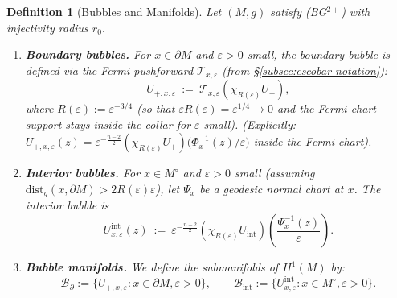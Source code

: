 \documentclass[11pt,reqno,a4paper]{amsart}
\numberwithin{equation}{section}
\newcommand{\dist}{\mathrm{dist}}
\theoremstyle{plain}
\newtheorem{definition}[theorem]{Definition}
\theoremstyle{remark}
\theoremstyle{plain}
\begin{document}
\begin{definition}[Bubbles and Manifolds]\label{def:bubbles}
Let $(M,g)$ satisfy \textup{(BG$^{2+}$)} with injectivity radius $r_0$.
\begin{enumerate}[label=\textbf{(\roman*)}, leftmargin=1.5em]
    \item \textbf{Boundary bubbles.} For $x\in\partial M$ and $\varepsilon>0$ small, the boundary bubble is defined via the Fermi pushforward $\mathcal T_{x,\varepsilon}$ (from \S\ref{subsec:escobar-notation}):
    \[
    U_{+,x,\varepsilon} \ :=\ \mathcal T_{x,\varepsilon}(\chi_{R(\varepsilon)} U_+),
    \]
    where $R(\varepsilon):=\varepsilon^{-3/4}$ (so that $\varepsilon R(\varepsilon)=\varepsilon^{1/4}\to0$ and the Fermi chart support stays inside the collar for $\varepsilon$ small).
    (Explicitly: $U_{+,x,\varepsilon}(z) = \varepsilon^{-\frac{n-2}{2}}(\chi_{R(\varepsilon)} U_+)\big(\Phi_x^{-1}(z)/\varepsilon\big)$ inside the Fermi chart).

    \item \textbf{Interior bubbles.} For $x\in M^\circ$ and $\varepsilon>0$ small (assuming $\dist_g(x,\partial M) > 2R(\varepsilon)\varepsilon$), let $\Psi_x$ be a geodesic normal chart at $x$. The interior bubble is
    \[
    U^{\mathrm{int}}_{x,\varepsilon}(z) \ :=\ \varepsilon^{-\frac{n-2}{2}}(\chi_{R(\varepsilon)} U_{\mathrm{int}})\left(\frac{\Psi_x^{-1}(z)}{\varepsilon}\right).
    \]

    \item \textbf{Bubble manifolds.} We define the submanifolds of $H^1(M)$ by:
    \[
    \mathcal B_\partial := \{ U_{+,x,\varepsilon} : x\in\partial M, \varepsilon>0 \},
    \qquad
    \mathcal B_{\mathrm{int}} := \{ U^{\mathrm{int}}_{x,\varepsilon} : x\in M^\circ, \varepsilon>0 \}.
    \]
\end{enumerate}
\end{definition}
\end{document}
